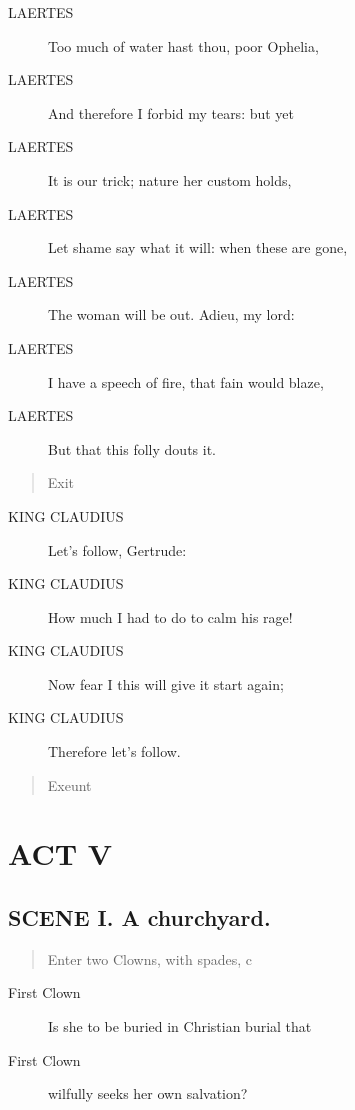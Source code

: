 \documentclass{article}
\begin{document}
\begin{description}
            
\item[LAERTES] Too much of water hast thou, poor Ophelia,
\item[LAERTES] And therefore I forbid my tears: but yet
\item[LAERTES] It is our trick; nature her custom holds,
\item[LAERTES] Let shame say what it will: when these are gone,
\item[LAERTES] The woman will be out. Adieu, my lord:
\item[LAERTES] I have a speech of fire, that fain would blaze,
\item[LAERTES] But that this folly douts it.
\end{description}
          
\begin{quote}
Exit
\end{quote}
          
\begin{description}
            
\item[KING CLAUDIUS] Let's follow, Gertrude:
\item[KING CLAUDIUS] How much I had to do to calm his rage!
\item[KING CLAUDIUS] Now fear I this will give it start again;
\item[KING CLAUDIUS] Therefore let's follow.
\end{description}
          
\begin{quote}
Exeunt
\end{quote}
          
\section{ACT V}
    
\subsection{SCENE I.  A churchyard.}
          
\begin{quote}
Enter two Clowns, with spades, c
\end{quote}
          
\begin{description}
            
\item[First Clown] Is she to be buried in Christian burial that
\item[First Clown] wilfully seeks her own salvation?
\end{description}
          
\end{document}
